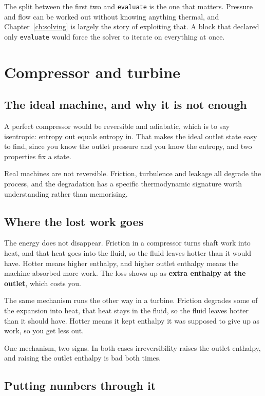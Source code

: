 \documentclass[11pt,a4paper]{report}
\newcommand{\code}[1]{\texttt{\small #1}}
\begin{document}
The split between the first two and \code{evaluate} is the one that matters.
Pressure and flow can be worked out without knowing anything thermal, and
Chapter~\ref{ch:solving} is largely the story of exploiting that. A block
that declared only \code{evaluate} would force the solver to iterate on
everything at once.

\section{Compressor and turbine}

\subsection{The ideal machine, and why it is not enough}

A perfect compressor would be reversible and adiabatic, which is to say
isentropic: entropy out equals entropy in. That makes the ideal outlet state
easy to find, since you know the outlet pressure and you know the entropy,
and two properties fix a state.

Real machines are not reversible. Friction, turbulence and leakage all
degrade the process, and the degradation has a specific thermodynamic
signature worth understanding rather than memorising.

\subsection{Where the lost work goes}

The energy does not disappear. Friction in a compressor turns shaft work
into heat, and that heat goes into the fluid, so the fluid leaves hotter
than it would have. Hotter means higher enthalpy, and higher outlet enthalpy
means the machine absorbed more work. The loss shows up as \textbf{extra
enthalpy at the outlet}, which costs you.

The same mechanism runs the other way in a turbine. Friction degrades some
of the expansion into heat, that heat stays in the fluid, so the fluid
leaves hotter than it should have. Hotter means it kept enthalpy it was
supposed to give up as work, so you get less out.

One mechanism, two signs. In both cases irreversibility raises the outlet
enthalpy, and raising the outlet enthalpy is bad both times.

\subsection{Putting numbers through it}
\end{document}

